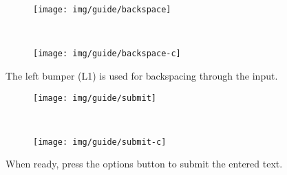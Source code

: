 \documentclass[guide.tex]{subfiles}
\begin{document}
\begin{figure}[H]
    \centering
    \begin{subfigure}[b]{0.65\textwidth}
        \texttt{[image: img/guide/backspace]}
        \label{fig:backspace_guide}
    \end{subfigure}
    ~
    \begin{subfigure}[b]{0.3\textwidth}
        \texttt{[image: img/guide/backspace-c]}
        \label{fig:backspace_input}
    \end{subfigure}
    \caption{The left bumper (L1) is used for backspacing through the input.}
\end{figure}

\begin{figure}[H]
    \centering
    \begin{subfigure}[b]{0.65\textwidth}
        \texttt{[image: img/guide/submit]}
        \label{fig:submit_guide}
    \end{subfigure}
    ~
    \begin{subfigure}[b]{0.3\textwidth}
        \texttt{[image: img/guide/submit-c]}
        \label{fig:submit_input}
    \end{subfigure}
    \caption{When ready, press the options button to submit the entered text.}
\end{figure}
\end{document}
